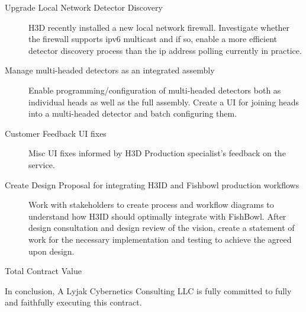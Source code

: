 \documentclass[8pt, letterpaper]{awesome-cv} %
\begin{document}
\begin{cvletter}
\begin{description}
    \item[Upgrade Local Network Detector Discovery] H3D recently installed a new local network
      firewall. Investigate whether the firewall supports ipv6 multicast and if so, enable a more
      efficient detector discovery process than the ip address polling currently in
      practice. 

    \item[Manage multi-headed detectors as an integrated assembly] Enable programming/configuration
      of multi-headed detectors both as individual heads as well as the full assembly. Create a UI
      for joining heads into a multi-headed detector and batch configuring
      them. 

    \item[Customer Feedback UI fixes] Misc UI fixes informed by H3D Production specialist's feedback
      on the service. 

    \item[Create Design Proposal for integrating H3ID and Fishbowl production workflows] Work with
      stakeholders to create process and workflow diagrams to understand how H3ID should optimally
      integrate with FishBowl. After design consultation and design review of the vision, create a
      statement of work for the necessary implementation and testing to achieve the agreed upon
      design. 

    \item[Total Contract Value] 

  \end{description}

  In conclusion, A Lyjak Cybernetics Consulting LLC is fully committed to fully and faithfully
  executing this contract. \\

\end{cvletter}
 \\\\\\\\\\
 \\



\end{document}
